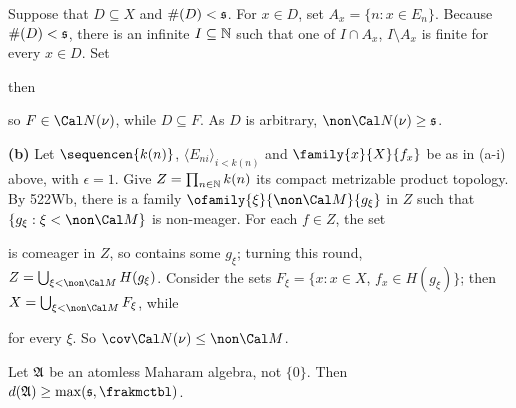 {Suppose that $D\subseteq X$ and $\#(D)<\frak s$.   For $x\in D$, set
$A_x=\{n:x\in E_n\}$.   Because $\#(D)<\frak s$, there is an infinite
$I\subseteq\Bbb N$ such that one of $I\cap A_x$, $I\setminus A_x$ is
finite for every $x\in D$.   Set


\noindent then


\noindent so $F\in\Cal N(\nu)$, while $D\subseteq F$.   As $D$ is
arbitrary, $\non\Cal N(\nu)\ge\frak s$.

\medskip

{\bf (b)} Let $\sequencen{k(n)}$, $\langle E_{ni}\rangle_{i<k(n)}$ and
$\family{x}{X}{f_x}$ be as in (a-i) above, with $\epsilon=1$.   Give
$Z=\prod_{n\in\Bbb N}k(n)$ its compact metrizable product topology.
By 522Wb, there is a family $\ofamily{\xi}{\non\Cal M}{g_{\xi}}$ in
$Z$ such that $\{g_{\xi}:\xi<\non\Cal M\}$ is non-meager.   For each
$f\in Z$, the set


\noindent is comeager in $Z$, so contains some $g_{\xi}$;  turning this
round, $Z=\bigcup_{\xi<\non\Cal M}H(g_{\xi})$.   Consider the sets
$F_{\xi}=\{x:x\in X$, $f_x\in H(g_{\xi})\}$;  then
$X=\bigcup_{\xi<\non\Cal M}F_{\xi}$, while


\noindent for every $\xi$.   So $\cov\Cal N(\nu)\le\non\Cal M$.
}%

 Let $\frak A$ be an atomless Maharam
algebra, not $\{0\}$.   Then $d(\frak A)\ge\max(\frak s,\frakmctbl)$.


